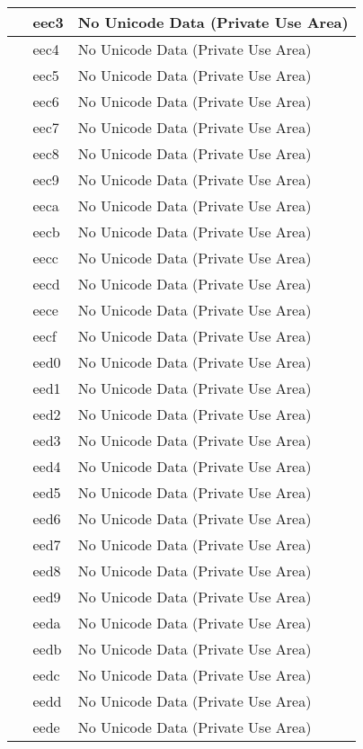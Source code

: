 \documentclass[12pt,letterpaper,openany]{book}
\begin{document}
\begin{center}
\begin{supertabular}{|m{0.25in}|m{0.5in}|m{4in}|}
 & eec3 & No Unicode Data (Private Use Area)\\\hline
 & eec4 & No Unicode Data (Private Use Area)\\\hline
 & eec5 & No Unicode Data (Private Use Area)\\\hline
 & eec6 & No Unicode Data (Private Use Area)\\\hline
 & eec7 & No Unicode Data (Private Use Area)\\\hline
 & eec8 & No Unicode Data (Private Use Area)\\\hline
 & eec9 & No Unicode Data (Private Use Area)\\\hline
 & eeca & No Unicode Data (Private Use Area)\\\hline
 & eecb & No Unicode Data (Private Use Area)\\\hline
 & eecc & No Unicode Data (Private Use Area)\\\hline
 & eecd & No Unicode Data (Private Use Area)\\\hline
 & eece & No Unicode Data (Private Use Area)\\\hline
 & eecf & No Unicode Data (Private Use Area)\\\hline
 & eed0 & No Unicode Data (Private Use Area)\\\hline
 & eed1 & No Unicode Data (Private Use Area)\\\hline
 & eed2 & No Unicode Data (Private Use Area)\\\hline
 & eed3 & No Unicode Data (Private Use Area)\\\hline
 & eed4 & No Unicode Data (Private Use Area)\\\hline
 & eed5 & No Unicode Data (Private Use Area)\\\hline
 & eed6 & No Unicode Data (Private Use Area)\\\hline
 & eed7 & No Unicode Data (Private Use Area)\\\hline
 & eed8 & No Unicode Data (Private Use Area)\\\hline
 & eed9 & No Unicode Data (Private Use Area)\\\hline
 & eeda & No Unicode Data (Private Use Area)\\\hline
 & eedb & No Unicode Data (Private Use Area)\\\hline
 & eedc & No Unicode Data (Private Use Area)\\\hline
 & eedd & No Unicode Data (Private Use Area)\\\hline
 & eede & No Unicode Data (Private Use Area)\\\hline

\end{supertabular}
\end{center}
\end{document}
